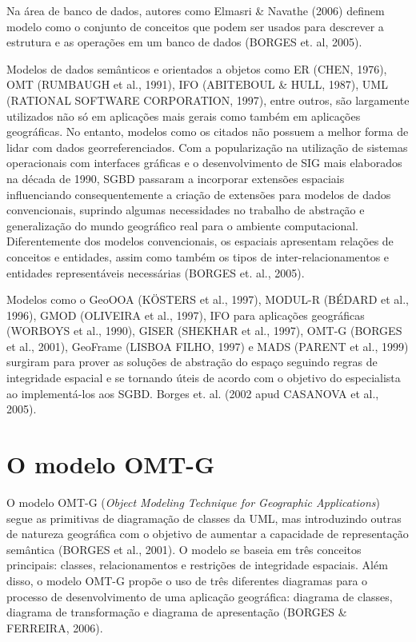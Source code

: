 	 Na área de banco de dados, autores como Elmasri \& Navathe (2006)\cite{ELMASRI_NAVATHE} definem modelo como o conjunto de conceitos que podem ser usados para descrever a estrutura e as operações em um banco de dados (BORGES et. al, 2005)\cite{BORGES_etal05}.
	           
	   Modelos de dados semânticos e orientados a objetos como ER (CHEN, 1976)\cite{CHEN}, OMT (RUMBAUGH et al., 1991)\cite{RUMBAUGH_etal91}, IFO (ABITEBOUL \& HULL, 1987)\cite{ABITEBOUL}, UML (RATIONAL SOFTWARE CORPORATION, 1997)\cite{UML}, entre outros, são largamente utilizados não só em aplicações mais gerais como também em aplicações geográficas. No entanto, modelos como os citados não possuem a melhor forma de lidar com dados georreferenciados. Com a popularização na utilização de sistemas operacionais com interfaces gráficas e o desenvolvimento de SIG mais elaborados na década de 1990, SGBD passaram a incorporar extensões espaciais influenciando consequentemente a criação de extensões para modelos de dados convencionais, suprindo algumas necessidades no trabalho de abstração e generalização do mundo geográfico real para o ambiente computacional. Diferentemente dos modelos convencionais, os espaciais apresentam relações de conceitos e entidades, assim como também os tipos de inter-relacionamentos e entidades representáveis necessárias (BORGES et. al., 2005)\cite{BORGES_etal05}.       
	   
	   Modelos como o GeoOOA (KÖSTERS et al., 1997)\cite{KOSTERS_etal97}, MODUL-R (BÉDARD et al., 1996)\cite{BEDARD_etal96}, GMOD (OLIVEIRA et al., 1997)\cite{OLIVEIRA_etal97}, IFO para aplicações geográficas (WORBOYS et al., 1990)\cite{WORBOYS_etal90}, GISER (SHEKHAR et al., 1997)\cite{SHEKHAR_etal97}, OMT-G (BORGES et al., 2001)\cite{BORGES_elat01}, GeoFrame (LISBOA FILHO, 1997)\cite{LISBOA_FILHO} e MADS (PARENT et al., 1999)\cite{PARENT_etal99} surgiram para prover as soluções de abstração do espaço seguindo regras de integridade espacial e se tornando úteis de acordo com o objetivo do especialista ao implementá-los aos SGBD. Borges et. al. (2002\cite{BORGES_elat02} apud CASANOVA et al., 2005\cite{CASANOVA_etal05}).
	   
	   \section{O modelo OMT-G}
	   
	   O modelo OMT-G (\textit{Object Modeling Technique for Geographic Applications}) segue as primitivas de diagramação de classes da UML, mas introduzindo outras de natureza geográfica com o objetivo de aumentar a capacidade de representação semântica (BORGES et al., 2001)\cite{BORGES_elat01}. O modelo se baseia em três conceitos principais: classes, relacionamentos e restrições de integridade espaciais. Além disso, o modelo OMT-G propõe o uso de três diferentes diagramas para o processo de desenvolvimento de uma aplicação geográfica: diagrama de classes, diagrama de transformação e diagrama de apresentação (BORGES \& FERREIRA, 2006)\cite{BORGES_etal05}.
	   
